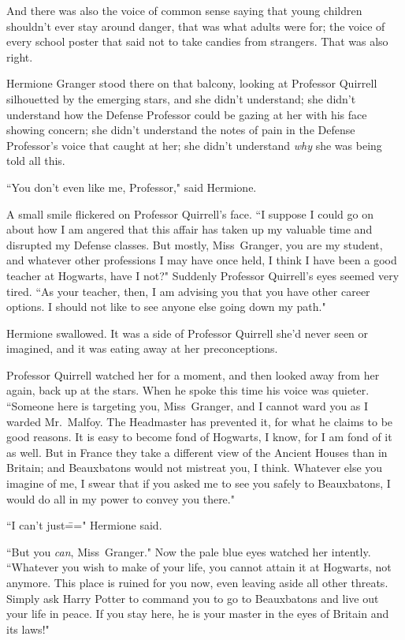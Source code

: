 And there was also the voice of common sense saying that young children shouldn't ever stay around danger, that was what adults were for; the voice of every school poster that said not to take candies from strangers. That was also right.

Hermione Granger stood there on that balcony, looking at Professor Quirrell silhouetted by the emerging stars, and she didn't understand; she didn't understand how the Defense Professor could be gazing at her with his face showing concern; she didn't understand the notes of pain in the Defense Professor's voice that caught at her; she didn't understand \emph{why} she was being told all this.

``You don't even like me, Professor," said Hermione.

A small smile flickered on Professor Quirrell's face. ``I suppose I could go on about how I am angered that this affair has taken up my valuable time and disrupted my Defense classes. But mostly, Miss~Granger, you are my student, and whatever other professions I may have once held, I think I have been a good teacher at Hogwarts, have I not?" Suddenly Professor Quirrell's eyes seemed very tired. ``As your teacher, then, I am advising you that you have other career options. I should not like to see anyone else going down my path."

Hermione swallowed. It was a side of Professor Quirrell she'd never seen or imagined, and it was eating away at her preconceptions.

Professor Quirrell watched her for a moment, and then looked away from her again, back up at the stars. When he spoke this time his voice was quieter. ``Someone here is targeting you, Miss~Granger, and I cannot ward you as I warded Mr.~Malfoy. The Headmaster has prevented it, for what he claims to be good reasons. It is easy to become fond of Hogwarts, I know, for I am fond of it as well. But in France they take a different view of the Ancient Houses than in Britain; and Beauxbatons would not mistreat you, I think. Whatever else you imagine of me, I swear that if you asked me to see you safely to Beauxbatons, I would do all in my power to convey you there."

``I can't just\===" Hermione said.

``But you \emph{can}, Miss~Granger." Now the pale blue eyes watched her intently. ``Whatever you wish to make of your life, you cannot attain it at Hogwarts, not anymore. This place is ruined for you now, even leaving aside all other threats. Simply ask Harry Potter to command you to go to Beauxbatons and live out your life in peace. If you stay here, he is your master in the eyes of Britain and its laws!"

